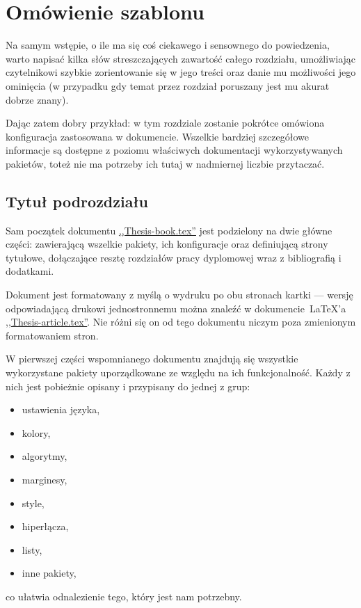 \chapter{Omówienie szablonu}
\thispagestyle{chapterBeginStyle}





Na samym wstępie, o ile ma się coś ciekawego i sensownego do powiedzenia, warto napisać kilka słów streszczających zawartość całego rozdziału, umożliwiając czytelnikowi szybkie zorientowanie się w jego treści oraz danie mu możliwości jego ominięcia (w przypadku gdy temat przez rozdział poruszany jest mu akurat dobrze znany).

Dając zatem dobry przykład: w tym rozdziale zostanie pokrótce omówiona konfiguracja zastosowana w dokumencie.
Wszelkie bardziej szczegółowe informacje są dostępne z poziomu właściwych dokumentacji wykorzystywanych pakietów, toteż nie ma potrzeby ich tutaj w nadmiernej liczbie przytaczać.




\section{Tytuł podrozdziału}




Sam początek dokumentu \href{Thesis-book.tex}{,,Thesis-book.tex''} jest podzielony na dwie główne części: zawierającą wszelkie pakiety, ich konfiguracje oraz definiującą strony tytułowe, dołączające resztę rozdziałów pracy dyplomowej wraz z bibliografią i dodatkami.

Dokument jest formatowany z myślą o wydruku po obu stronach kartki --- wersję odpowiadającą drukowi jednostronnemu można znaleźć w dokumencie~\LaTeX'a \href{Thesis-article.tex}{,,Thesis-article.tex''}.
Nie różni się on od tego dokumentu niczym poza zmienionym formatowaniem stron.

W pierwszej części wspomnianego dokumentu znajdują się wszystkie wykorzystane pakiety uporządkowane ze względu na ich funkcjonalność.
Każdy z nich jest pobieżnie opisany i przypisany do jednej z grup:

\begin{itemize}
	\item ustawienia języka,
	\item kolory,
	\item algorytmy,
	\item marginesy,
	\item style,
	\item hiperłącza,
	\item listy,
	\item inne pakiety,
\end{itemize}
co ułatwia odnalezienie tego, który jest nam potrzebny.

